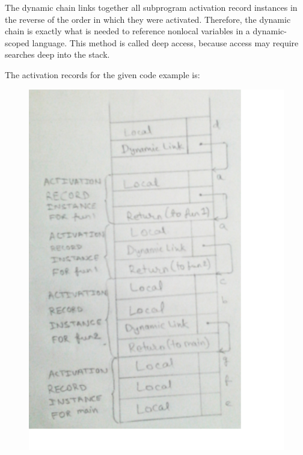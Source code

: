 \documentclass[a4paper,12pt]{article}
\begin{document}
The dynamic chain links together all subprogram activation record instances in the reverse of the order in which they were activated. Therefore, the dynamic chain is exactly what is needed to reference
nonlocal variables in a dynamic-scoped language. This method is called deep
access, because access may require searches deep into the stack.

The activation records for the given code example is:\\
\begin{figure}
\centering
\includegraphics[scale=0.6]{q7}
\end{figure}
\pagebreak
\\
\\
\\
\\
\\
\\
\\
\end{document}
